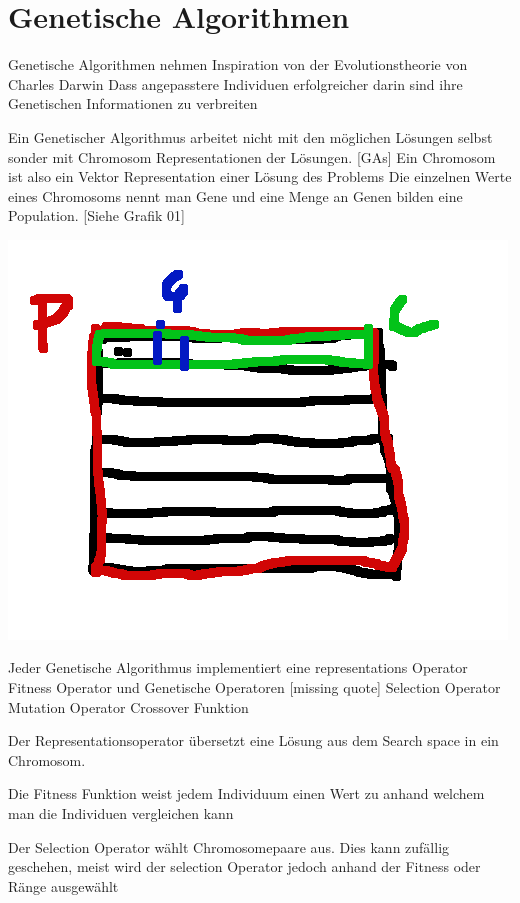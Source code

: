 \section{Genetische Algorithmen}

Genetische Algorithmen nehmen Inspiration von der Evolutionstheorie von Charles Darwin
Dass angepasstere Individuen erfolgreicher darin sind ihre Genetischen Informationen zu verbreiten

Ein Genetischer Algorithmus arbeitet nicht mit den möglichen Lösungen selbst
sonder mit Chromosom Representationen der Lösungen. [GAs]
Ein Chromosom ist also ein Vektor Representation einer Lösung des Problems
Die einzelnen Werte eines Chromosoms nennt man Gene und eine Menge an Genen 
bilden eine Population. [Siehe Grafik 01]

\includegraphics[scale=1.0]{images/Population_Chromosom_Gen.png}


Jeder Genetische Algorithmus implementiert eine 
representations Operator 
Fitness Operator
und Genetische Operatoren [missing quote]
Selection Operator
Mutation Operator
Crossover Funktion


Der Representationsoperator übersetzt eine Lösung aus dem Search space 
in ein Chromosom. 


Die Fitness Funktion weist jedem Individuum einen Wert zu anhand welchem man die 
Individuen vergleichen kann


Der Selection Operator wählt Chromosomepaare aus. Dies kann 
zufällig geschehen, meist wird der selection Operator jedoch anhand der Fitness oder Ränge ausgewählt


